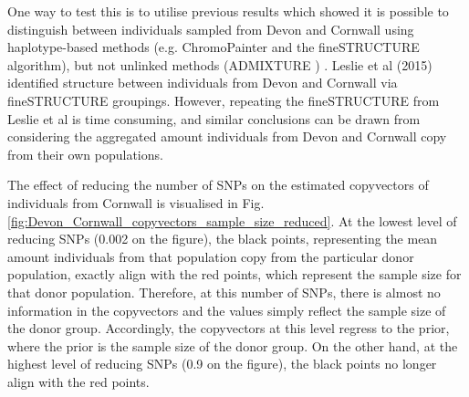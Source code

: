 One way to test this is to utilise previous results which showed it is possible to distinguish between individuals sampled from Devon and Cornwall using haplotype-based methods (e.g. ChromoPainter and the fineSTRUCTURE algorithm), but not unlinked methods (ADMIXTURE \cite{alexander2009fast}) \cite{Leslie2015}. Leslie et al (2015) identified structure between individuals from Devon and Cornwall via fineSTRUCTURE groupings. However, repeating the fineSTRUCTURE from Leslie et al is time consuming, and similar conclusions can be drawn from considering the aggregated amount individuals from Devon and Cornwall copy from their own populations.

The effect of reducing the number of SNPs on the estimated copyvectors of individuals from Cornwall is visualised in Fig. \ref{fig:Devon_Cornwall_copyvectors_sample_size_reduced}. At the lowest level of reducing SNPs (0.002 on the figure), the black points, representing the mean amount individuals from that population copy from the particular donor population, exactly align with the red points, which represent the sample size for that donor population. Therefore, at this number of SNPs, there is almost no information in the copyvectors and the values simply reflect the sample size of the donor group. Accordingly, the copyvectors at this level regress to the prior, where the prior is the sample size of the donor group. On the other hand, at the highest level of reducing SNPs (0.9 on the figure), the black points no longer align with the red points. 

